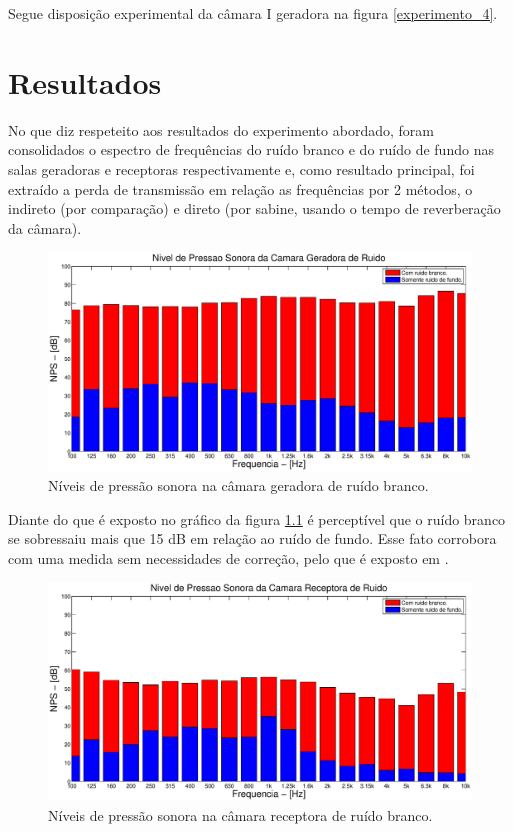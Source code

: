 Segue disposição experimental da câmara I geradora na figura \ref{experimento_4}.


\chapter{Resultados}\label{resultados}

No que diz respeteito aos resultados do experimento abordado, foram consolidados o espectro de frequências do ruído branco e do ruído de fundo nas salas geradoras e receptoras respectivamente e, como resultado principal, foi extraído a perda de transmissão em relação as frequências por 2 métodos, o indireto (por comparação) e direto (por sabine, usando o tempo de reverberação da câmara).

\begin{figure}[h]
\hspace{-4.5cm}
\includegraphics[scale=0.6]{codigo/pressao_sonora_geradora.eps}
\caption{Níveis de pressão sonora na câmara geradora de ruído branco.}
\label{resultado_1}
\end{figure}

Diante do que é exposto no gráfico da figura \ref{resultado_1} é perceptível que o ruído branco se sobressaiu mais que 15 dB em relação ao ruído de fundo. Esse fato corrobora com uma medida sem necessidades de correção, pelo que é exposto em \cite{silva2009simulaccao}.

\newpage
\begin{figure}[h]
\hspace{-4.5cm}
\includegraphics[scale=0.6]{codigo/pressao_sonora_receptora.eps}
\caption{Níveis de pressão sonora na câmara receptora de ruído branco.}
\label{resultado_2}
\end{figure}

